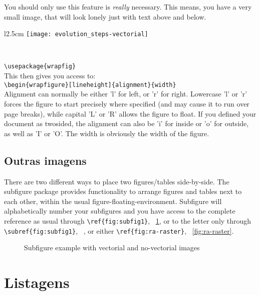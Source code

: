  You should only use this feature is \emph{really} necessary. This means, you have a very small image, that will look lonely just with text above and below.

 \begin{wrapfigure}{l}{2.5cm}
   \centering
     \texttt{[image: evolution\_steps-vectorial]}
   \caption{Vectorial image}\
 \end{wrapfigure}	
 
 \noindent\verb!\usepackage{wrapfig}!\\
 This then gives you access to:\\
 \verb!\begin{wrapfigure}[lineheight]{alignment}{width}!
 \\
 Alignment can normally be either 'l' for left, or 'r' for right. Lowercase 'l' or 'r' forces the figure to start precisely where specified (and may cause it to run over page breaks), while capital 'L' or 'R' allows the figure to float. If you defined your document as twosided, the alignment can also be 'i' for inside or 'o' for outside, as well as 'I' or 'O'. The width is obviously the width of the figure. 
 
\subsection{Outras imagens} %
\label{ssec:floats_figures_and_captions}

 
There are two different ways to place two figures/tables side-by-side. The subfigure package provides functionality to arrange figures and tables next to each other, within the usual figure-floating-environment. Subfigure will alphabetically number your subfigures and you have access to the complete reference as usual through \verb!\ref{fig:subfig1}!, \figurename~\ref{fig:figura-completa}, or to the letter only through \verb!\subref{fig:subfig1}!, ~, or either \verb!\ref{fig:ra-raster}!,  \figurename~\ref{fig:ra-raster}.

\begin{figure}[H]
	\centering
\qquad\qquad
  \caption{Subfigure example with vectorial and no-vectorial images}
  \label{fig:figura-completa}
\end{figure}

\section{Listagens} %
\label{sec:listings}

